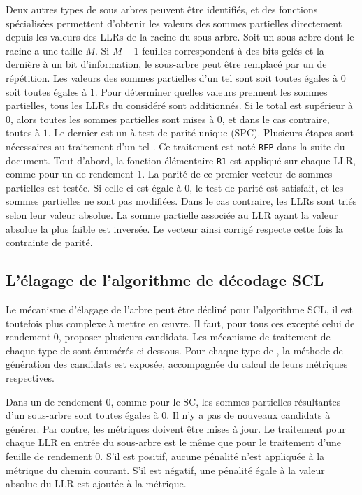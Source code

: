 Deux autres types de sous arbres peuvent être identifiés, et des fonctions spécialisées permettent d'obtenir les valeurs des sommes partielles directement depuis les valeurs des LLRs de la racine du sous-arbre. Soit un sous-arbre dont le \noeud racine a une taille $M$. Si $M-1$ feuilles correspondent à des bits gelés et la dernière à un bit d'information, le sous-arbre peut être remplacé par un \noeud de répétition. Les valeurs des sommes partielles d'un tel \noeud sont soit toutes égales à $0$ soit toutes égales à $1$. Pour déterminer quelles valeurs prennent les sommes partielles, tous les LLRs du \noeud considéré sont additionnés. Si le total est supérieur à 0, alors toutes les sommes partielles sont mises à $0$, et dans le cas contraire, toutes à $1$. Le dernier est un \noeud à test de parité unique (SPC). Plusieurs étapes sont nécessaires au traitement d'un tel \noeud. Ce traitement est noté \texttt{REP} dans la suite du document. Tout d'abord, la fonction élémentaire \texttt{R1} est appliqué sur chaque LLR, comme pour un \noeud de rendement 1. La parité de ce premier vecteur de sommes partielles est testée. Si celle-ci est égale à 0, le test de parité est satisfait, et les sommes partielles ne sont pas modifiées. Dans le cas contraire, les LLRs sont triés selon leur valeur absolue. La somme partielle associée au LLR ayant la valeur absolue la plus faible est inversée. Le vecteur ainsi corrigé respecte cette fois la contrainte de parité.

\subsection{L'élagage de l'algorithme de décodage SCL}

Le mécanisme d'élagage de l'arbre peut être décliné pour l'algorithme SCL, il est toutefois plus complexe à mettre en œuvre. Il faut, pour tous ces \noeud excepté celui de rendement 0, proposer plusieurs candidats. Les mécanisme de traitement de chaque type de \noeud sont énumérés ci-dessous. Pour chaque type de \noeud, la méthode de génération des candidats est exposée, accompagnée du calcul de leurs métriques respectives.

Dans un \noeud de rendement 0, comme pour le SC, les sommes partielles résultantes d'un sous-arbre sont toutes égales à 0. Il n'y a pas de nouveaux candidats à générer. Par contre, les métriques doivent être mises à jour. Le traitement pour chaque LLR en entrée du sous-arbre est le même que pour le traitement d'une feuille de rendement 0. S'il est positif, aucune pénalité n'est appliquée à la métrique du chemin courant. S'il est négatif, une pénalité égale à la valeur absolue du LLR est ajoutée à la métrique. 

